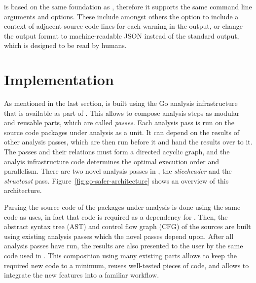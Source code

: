 \toolSafer{} is based on the same foundation as \toolVet{}, therefore it supports the same command line arguments and
options.
These include amongst others the option to include a context of adjacent source code lines for each warning in the
output, or change the output format to machine-readable JSON instead of the standard output, which is designed to be
read by humans.



\section{Implementation}\label{sec:go-safer:implementation}

As mentioned in the last section, \toolSafer{} is built using the Go analysis infrastructure that is available as part
of \toolVet{}.
This allows to compose analysis steps as modular and reusable parts, which are called \textit{passes}.
Each analysis pass is run on the source code packages under analysis as a unit.
It can depend on the results of other analysis passes, which are then run before it and hand the results over to it.
The passes and their relations must form a directed acyclic graph, and the analyis infrastructure code determines the
optimal execution order and parallelism.
There are two novel analysis passes in \toolSafer{}, the \textit{sliceheader} and the \textit{structcast} pass.
Figure~\ref{fig:go-safer-architecture} shows an overview of this architecture.



Parsing the source code of the packages under analysis is done using the same code as \toolVet{} uses, in fact that code
is required as a dependency for \toolSafer{}.
Then, the abstract syntax tree (\acrshort{AST}) and control flow graph (\acrshort{CFG}) of the sources are built using
existing analysis passes which the novel \toolSafer{} passes depend upon.
After all analysis passes have run, the results are also presented to the user by the same code used in \toolVet{}.
This composition using many existing parts allows to keep the required new code to a minimum, reuses well-tested pieces
of code, and allows to integrate the new \toolSafer{} features into a familiar workflow.

